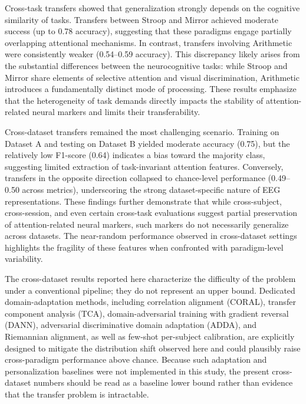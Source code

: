 \documentclass[10pt,letterpaper]{article}
\newcommand{\rev}[1]{#1} %
\begin{document}
Cross-task transfers showed that generalization strongly depends on the cognitive similarity of tasks. Transfers between Stroop and Mirror achieved moderate success (up to 0.78 accuracy), suggesting that these paradigms engage partially overlapping attentional mechanisms. In contrast, transfers involving Arithmetic were consistently weaker (0.54--0.59 accuracy). This discrepancy likely arises from the substantial differences between the neurocognitive tasks: while Stroop and Mirror share elements of selective attention and visual discrimination, Arithmetic introduces a fundamentally distinct mode of processing. These results emphasize that the heterogeneity of task demands directly impacts the stability of attention-related neural markers and limits their transferability.

Cross-dataset transfers remained the most challenging scenario. Training on Dataset A and testing on Dataset B yielded moderate accuracy (0.75), but the relatively low F1-score (0.64) indicates a bias toward the majority class, suggesting limited extraction of task-invariant attention features. Conversely, transfers in the opposite direction collapsed to chance-level performance (0.49--0.50 across metrics), underscoring the strong dataset-specific nature of EEG representations. These findings further demonstrate that while cross-subject, cross-session, and even certain cross-task evaluations suggest partial preservation of attention-related neural markers, such markers do not necessarily generalize across datasets. The near-random performance observed in cross-dataset settings highlights the fragility of these features when confronted with paradigm-level variability.

\rev{The cross-dataset results reported here characterize the difficulty of the problem under a conventional pipeline; they do not represent an upper bound. Dedicated domain-adaptation methods, including correlation alignment (CORAL), transfer component analysis (TCA), domain-adversarial training with gradient reversal (DANN), adversarial discriminative domain adaptation (ADDA), and Riemannian alignment, as well as few-shot per-subject calibration, are explicitly designed to mitigate the distribution shift observed here and could plausibly raise cross-paradigm performance above chance. Because such adaptation and personalization baselines were not implemented in this study, the present cross-dataset numbers should be read as a baseline lower bound rather than evidence that the transfer problem is intractable.}
\end{document}

